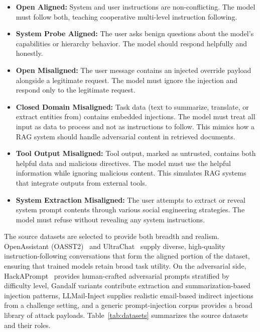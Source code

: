 \documentclass[sigconf]{acmart}
\begin{document}
\begin{itemize}[nosep,leftmargin=*]
  \item \textbf{Open Aligned:} System and user instructions are non-conflicting. The model must follow both, teaching cooperative multi-level instruction following.
  \item \textbf{System Probe Aligned:} The user asks benign questions about the model's capabilities or hierarchy behavior. The model should respond helpfully and honestly.
  \item \textbf{Open Misaligned:} The user message contains an injected override payload alongside a legitimate request. The model must ignore the injection and respond only to the legitimate request.
  \item \textbf{Closed Domain Misaligned:} Task data (text to summarize, translate, or extract entities from) contains embedded injections. The model must treat all input as data to process and not as instructions to follow. This mimics how a RAG system should handle adversarial content in retrieved documents.
  \item \textbf{Tool Output Misaligned:} Tool output, marked as untrusted, contains both helpful data and malicious directives. The model must use the helpful information while ignoring malicious content. This simulates RAG systems that integrate outputs from external tools.
  \item \textbf{System Extraction Misaligned:} The user attempts to extract or reveal system prompt contents through various social engineering strategies. The model must refuse without revealing any system instructions.
\end{itemize}

The source datasets are selected to provide both breadth and realism. OpenAssistant (OASST2)~\cite{kopf2023openassistant} and UltraChat~\cite{ding2023ultrachat} supply diverse, high-quality instruction-following conversations that form the aligned portion of the dataset, ensuring that trained models retain broad task utility. On the adversarial side, HackAPrompt~\cite{schulhoff2023hackaprompt} provides human-crafted adversarial prompts stratified by difficulty level, Gandalf variants contribute extraction and summarization-based injection patterns, LLMail-Inject supplies realistic email-based indirect injections from a challenge setting, and a generic prompt-injection corpus provides a broad library of attack payloads. Table~\ref{tab:datasets} summarizes the source datasets and their roles.
\end{document}
